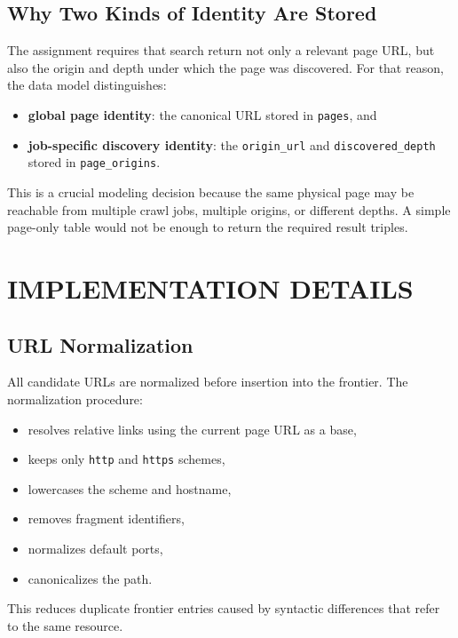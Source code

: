 \documentclass[pdftex,12pt,a4paper]{article}
\begin{document}
\subsection{Why Two Kinds of Identity Are Stored}

The assignment requires that search return not only a relevant page URL, but also the origin and depth under which the page was discovered. For that reason, the data model distinguishes:

\begin{itemize}
    \item \textbf{global page identity}: the canonical URL stored in \texttt{pages}, and
    \item \textbf{job-specific discovery identity}: the \texttt{origin\_url} and \texttt{discovered\_depth} stored in \texttt{page\_origins}.
\end{itemize}

This is a crucial modeling decision because the same physical page may be reachable from multiple crawl jobs, multiple origins, or different depths. A simple page-only table would not be enough to return the required result triples.

\section{IMPLEMENTATION DETAILS}
\label{sec:implementation}

\subsection{URL Normalization}

All candidate URLs are normalized before insertion into the frontier. The normalization procedure:

\begin{itemize}
    \item resolves relative links using the current page URL as a base,
    \item keeps only \texttt{http} and \texttt{https} schemes,
    \item lowercases the scheme and hostname,
    \item removes fragment identifiers,
    \item normalizes default ports,
    \item canonicalizes the path.
\end{itemize}

This reduces duplicate frontier entries caused by syntactic differences that refer to the same resource.
\end{document}
